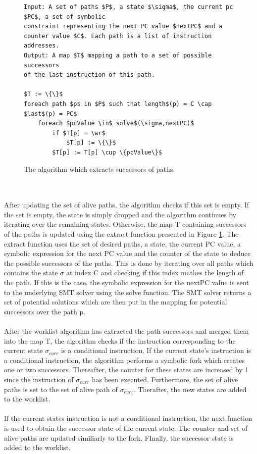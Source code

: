 \documentclass{kththesis}
\begin{document}
\begin{figure}[!htbp]
    \centering
\begin{algorithmFrame}
\begin{lstlisting}[style=algorithm]
Input: A set of paths $P$, a state $\sigma$, the current pc $PC$, a set of symbolic
constraint representing the next PC value $nextPC$ and a 
counter value $C$. Each path is a list of instruction addresses. 
Output: A map $T$ mapping a path to a set of possible successors 
of the last instruction of this path.

$T := \{\}$
foreach path $p$ in $P$ such that length$(p) = C \cap $last$(p) = PC$
    foreach $pcValue \in$ solve$(\sigma,nextPC)$
        if $T[p] = \wr$
            $T[p] := \{\}$    
        $T[p] := T[p] \cup \{pcValue\}$

\end{lstlisting}
\end{algorithmFrame}
\caption[The algorithm which extracts successors of paths.]{The algorithm which extracts successors of paths.}
    \label{fig:DSEextract}
\end{figure}
\\ \\
After updating the set of alive paths, the algorithm checks if this set is empty. If the set is empty, the state is simply dropped and the algorithm continues by iterating over the remaining states. Otherwise, the map T containing successors of the paths is updated using the extract function presented in Figure \ref{fig:DSEextract}. The extract function uses the set of desired paths, a state, the current PC value, a symbolic expression for the next PC value and the counter of the state to deduce the possible successors of the paths. This is done by iterating over all paths which contains the state $\sigma$ at index C and checking if this index mathes the length of the path. If this is the case, the symbolic expression for the nextPC value is sent to the underlying SMT solver using the solve function. The SMT solver returns a set of potential solutions which are then put in the mapping for potential successors over the path p.
\\ \\
After the worklist algorithm has extracted the path successors and merged them into the map T, the algorithm checks if the instruction corresponding to the current state $\sigma_{curr}$ is a conditional instruction. If the current state's instruction is a conditional instruction, the algorithm performs a symbolic fork which creates one or two successors. Thereafter, the counter for these states are increased by 1 since the instruction of $\sigma_{curr}$ has been executed. Furthermore, the set of alive paths is set to the set of alive path of $\sigma_{curr}$. Therafter, the new states are added to the worklist.
\\ \\
If the current states instruction is not a conditional instruction, the next function is used to obtain the successor state of the current state. The counter and set of alive paths are updated similiarly to the fork. FInally, the successor state is added to the worklist.
\end{document}
